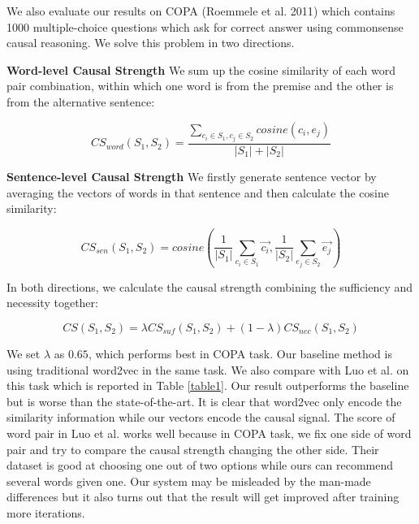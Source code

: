\documentclass[conference]{IEEEtran}
\newcommand{\tabref}[1]{Table \ref{#1}}
\newenvironment{sequation}  
{\small\begin{equation}}  
{\end{equation}}
\begin{document}
We also evaluate our results on COPA (Roemmele et al. 2011\cite{COPA}) which contains 1000 multiple-choice questions which ask for correct answer using commonsense causal reasoning.
We solve this problem in two directions.

\textbf{Word-level Causal Strength} We sum up the cosine similarity of each word pair combination, within which one word is from the premise and the other is from the alternative sentence:
\begin{spacing}{0.6}
\begin{sequation}
CS_{word}(S_1, S_2) = \frac{\sum_{c_i \in S_1, c_j \in S_2}{cosine(c_i, e_j)}}{|S_1|+|S_2|}
\end{sequation}
\end{spacing}

\textbf{Sentence-level Causal Strength} We firstly generate sentence vector by averaging the vectors of words in that sentence and then calculate the cosine similarity:
\begin{spacing}{0.6}
\begin{sequation}
CS_{sen}(S_1, S_2) = cosine(\frac{1}{|S_1|}\sum_{c_i \in S_1}{\overrightarrow{c_i}} , \frac{1}{|S_2|}{\sum_{e_j \in S_2}\overrightarrow{e_j}} )
\end{sequation}
\end{spacing}

In both directions, we calculate the causal strength combining the sufficiency and necessity together:
\begin{spacing}{0.6}
\begin{sequation}
CS(S_1, S_2) = \lambda CS_{suf}(S_1, S_2) + (1-\lambda) CS_{nec}(S_1, S_2)
\end{sequation}
\end{spacing}
We set $\lambda$ as $0.65$, which performs best in COPA task.
Our baseline method is using traditional word2vec in the same task. We also compare with Luo et al. on this task which is reported in \tabref{table1}. Our result outperforms the baseline but is worse than the state-of-the-art. It is clear that word2vec only encode the similarity information while our vectors encode the causal signal.
The score of word pair in Luo et al. works well because in COPA task, we fix one side of word pair and try to compare the causal strength changing the other side. Their dataset is good at choosing one out of two options while ours can recommend several words given one. Our system may be misleaded by the man-made differences but it also turns out that the result will get improved after training more iterations. 
\end{document}
